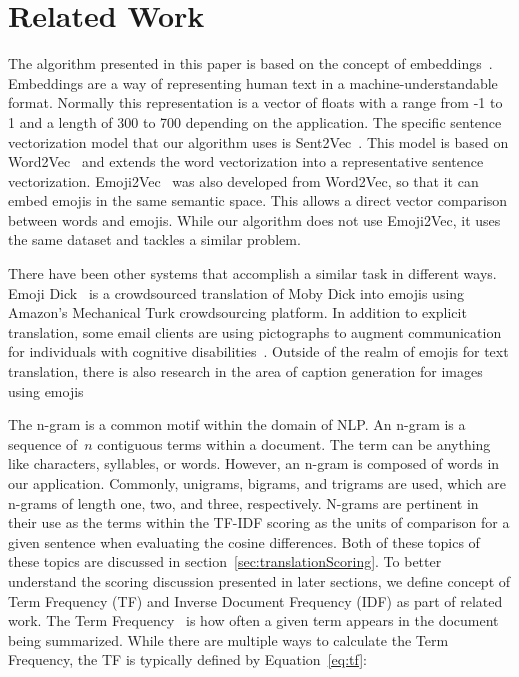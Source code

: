 \documentclass{article}[10]
\begin{document}
\section{Related Work}

The algorithm presented in this paper is based on the concept of
embeddings~\cite{WhatAreW70}. Embeddings are a way of representing human text in a
machine-understandable format. Normally this representation is a vector
of floats with a range from -1 to 1 and a length of 300 to 700 depending
on the application. The specific sentence vectorization model that our
algorithm uses is Sent2Vec~\cite{pg2017unsu}. This model is based on
Word2Vec~\cite{mikolov2013efficient} and extends the word vectorization into a
representative sentence vectorization. Emoji2Vec~\cite{Eisner_2016} was
also developed from Word2Vec, so that it can embed emojis in the same
semantic space. This allows a direct vector comparison between words and
emojis. While our algorithm does not use Emoji2Vec, it uses the same
dataset and tackles a similar problem.

There have been other systems that accomplish a similar task in
different ways. Emoji Dick~\cite{radford2016telephone} is a crowdsourced
translation of Moby Dick into emojis using Amazon's Mechanical Turk
crowdsourcing platform. In addition to explicit translation, some email
clients are using pictographs to augment communication for individuals
with cognitive disabilities~\cite{vandeghinste2017translating}. Outside of the realm
of emojis for text translation, there is also research in the area of
caption generation for images using emojis~\cite{mazoure-etal-2018-emojigan,cappallo2015image2emoji}

The n-gram is a common motif within the domain of NLP. An n-gram is a
sequence of~\(n\) contiguous terms within a document. The
term can be anything like characters, syllables, or words. However, an
n-gram is composed of words in our application. Commonly, unigrams,
bigrams, and trigrams are used, which are n-grams of length one, two,
and three, respectively. N-grams are pertinent in their use as the terms
within the TF-IDF scoring as the units of comparison for a given sentence when
evaluating the cosine differences. Both of these topics of these topics are
discussed in section~\ref{sec:translationScoring}. To better understand
the scoring discussion presented in later sections, we define concept of
Term Frequency (TF) and Inverse Document Frequency (IDF) as part of
related work. The Term
Frequency~\cite{Leskovec} is how often a given term appears in the
document being summarized. While there are multiple ways to calculate
the Term Frequency, the TF is typically defined by Equation~\eqref{eq:tf}:
\end{document}
